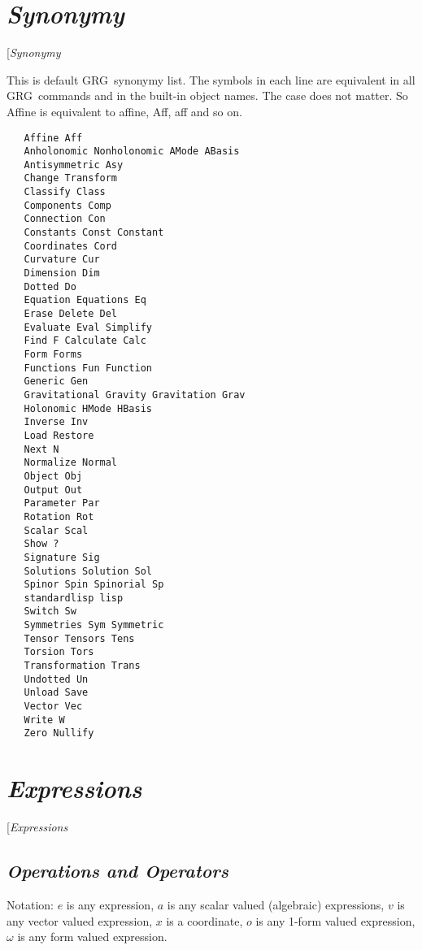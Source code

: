 \documentclass[twocolumn]{article}
\makeatletter
\newcommand{\grgtt}{\ttfamily}
\renewcommand{\tt}{\grgtt}
\newcommand{\grg}{GRG}
\def\chead{\@ifnextchar[{\@xchead}{\@ychead}}
\def\@xchead[#1]#2{\gdef\@echead{#1}\gdef\@ochead{#2}}
\def\@ychead#1{\gdef\@echead{#1}\gdef\@ochead{#1}}
\makeatother
\begin{document}
\newpage



\section{\LARGE\sf\slshape Synonymy}
\chead{\slshape Synonymy}

This is default \grg\ synonymy list.
The symbols in each line are equivalent in all
\grg\ commands and in the built-in object names.
The case does not matter. So {\tt Affine} is
equivalent to {\tt affine}, {\tt Aff}, {\tt aff}
and so on.

\begin{verbatim}
   Affine Aff
   Anholonomic Nonholonomic AMode ABasis
   Antisymmetric Asy
   Change Transform
   Classify Class
   Components Comp
   Connection Con
   Constants Const Constant
   Coordinates Cord
   Curvature Cur
   Dimension Dim
   Dotted Do
   Equation Equations Eq
   Erase Delete Del
   Evaluate Eval Simplify
   Find F Calculate Calc
   Form Forms
   Functions Fun Function
   Generic Gen
   Gravitational Gravity Gravitation Grav
   Holonomic HMode HBasis
   Inverse Inv
   Load Restore
   Next N
   Normalize Normal
   Object Obj
   Output Out
   Parameter Par
   Rotation Rot
   Scalar Scal
   Show ?
   Signature Sig
   Solutions Solution Sol
   Spinor Spin Spinorial Sp
   standardlisp lisp
   Switch Sw
   Symmetries Sym Symmetric
   Tensor Tensors Tens
   Torsion Tors
   Transformation Trans
   Undotted Un
   Unload Save
   Vector Vec
   Write W
   Zero Nullify
\end{verbatim}

\newpage


\section{\LARGE\sf\slshape Expressions}
\chead{\slshape Expressions}

\subsection{\sf\slshape Operations and Operators}

Notation:
$e$ is any expression,
$a$ is any scalar valued (algebraic) expressions,
$v$ is any vector valued expression,
$x$ is a coordinate,
$o$ is any 1-form valued expression,
$\omega$ is any form valued expression.
\end{document}
